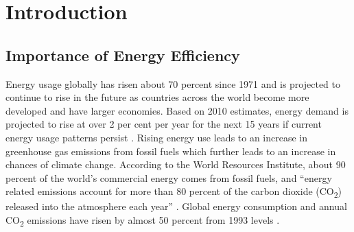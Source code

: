 %
%

\chapter{Introduction}\label{ch:intro} %



\section{Importance of Energy Efficiency} \label{sec:motivation}

Energy usage globally has risen about 70 percent since 1971 and is projected to continue to rise in the future as countries across the world become more developed and have larger economies. Based on 2010 estimates, energy demand is projected to rise at over 2 per cent per year for the next 15 years if current energy usage patterns persist \cite{wri}. Rising energy use leads to an increase in greenhouse gas emissions from fossil fuels which further leads to an increase in chances of climate change. According to the World Resources Institute, about 90 percent of the world's commercial energy comes from fossil fuels, and ``energy related emissions account for more than 80 percent of the carbon dioxide (CO\textsubscript{2}) released into the atmosphere each year'' \cite{wri}. Global energy consumption and annual CO\textsubscript{2} emissions have risen by almost 50 percent from 1993 levels \cite{wri}.

